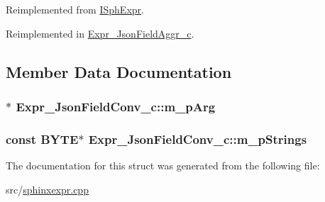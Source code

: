 Reimplemented from \hyperlink{structISphExpr_a5e1268916a46b2b9cabb93d30ca5c40c}{I\-Sph\-Expr}.



Reimplemented in \hyperlink{structExpr__JsonFieldAggr__c_ae1479f9f9c62c25d1577e96813b877bf}{Expr\-\_\-\-Json\-Field\-Aggr\-\_\-c}.



\subsection{Member Data Documentation}
\hypertarget{structExpr__JsonFieldConv__c_a5dc26c191422d2e20d37cc34ebee060e}{
\subsubsection[{m\-\_\-p\-Arg}]{$\ast$ Expr\-\_\-\-Json\-Field\-Conv\-\_\-c\-::m\-\_\-p\-Arg\hspace{0.3cm}{\ttfamily [protected]}}}\label{structExpr__JsonFieldConv__c_a5dc26c191422d2e20d37cc34ebee060e}
\hypertarget{structExpr__JsonFieldConv__c_a64669149245655ddcddfcdbed8be059a}{
\subsubsection[{m\-\_\-p\-Strings}]{\setlength{\rightskip}{0pt plus 5cm}const {\bf B\-Y\-T\-E}$\ast$ Expr\-\_\-\-Json\-Field\-Conv\-\_\-c\-::m\-\_\-p\-Strings\hspace{0.3cm}{\ttfamily [protected]}}}\label{structExpr__JsonFieldConv__c_a64669149245655ddcddfcdbed8be059a}


The documentation for this struct was generated from the following file\-:\begin{DoxyCompactItemize}
\item 
src/\hyperlink{sphinxexpr_8cpp}{sphinxexpr.\-cpp}\end{DoxyCompactItemize}
